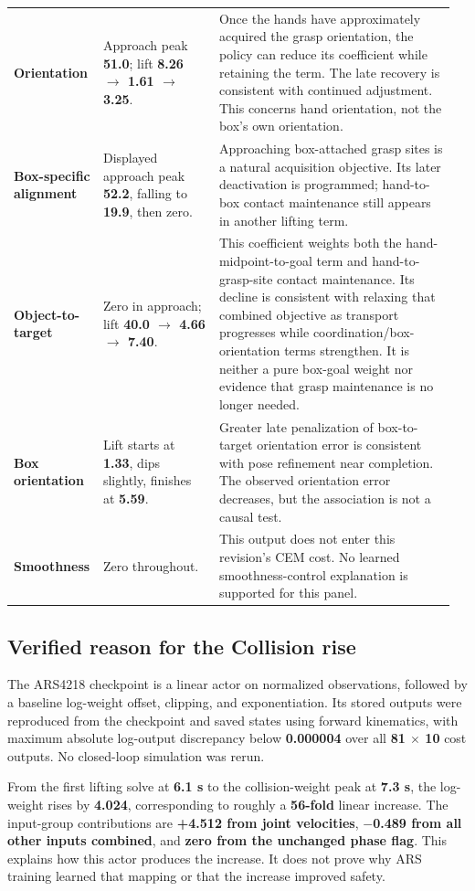 \documentclass[11pt,a4paper]{article}
\begin{document}
\begin{longtable}{@{}p{0.17\linewidth}p{0.26\linewidth}p{0.53\linewidth}@{}}
\textbf{Orientation} & Approach peak \textbf{51.0}; lift \textbf{8.26 \(\rightarrow\) 1.61 \(\rightarrow\) 3.25}. & Once the hands have approximately acquired the grasp orientation, the policy can reduce its coefficient while retaining the term. The late recovery is consistent with continued adjustment. This concerns hand orientation, not the box's own orientation. \\
\textbf{Box-specific alignment} & Displayed approach peak \textbf{52.2}, falling to \textbf{19.9}, then zero. & Approaching box-attached grasp sites is a natural acquisition objective. Its later deactivation is programmed; hand-to-box contact maintenance still appears in another lifting term. \\
\textbf{Object-to-target} & Zero in approach; lift \textbf{40.0 \(\rightarrow\) 4.66 \(\rightarrow\) 7.40}. & This coefficient weights both the hand-midpoint-to-goal term and hand-to-grasp-site contact maintenance. Its decline is consistent with relaxing that combined objective as transport progresses while coordination/box-orientation terms strengthen. It is neither a pure box-goal weight nor evidence that grasp maintenance is no longer needed. \\
\textbf{Box orientation} & Lift starts at \textbf{1.33}, dips slightly, finishes at \textbf{5.59}. & Greater late penalization of box-to-target orientation error is consistent with pose refinement near completion. The observed orientation error decreases, but the association is not a causal test. \\
\textbf{Smoothness} & Zero throughout. & This output does not enter this revision's CEM cost. No learned smoothness-control explanation is supported for this panel. \\
\end{longtable}
\endgroup

\subsection{Verified reason for the Collision rise}

The ARS4218 checkpoint is a linear actor on normalized observations, followed by a baseline log-weight offset, clipping, and exponentiation. Its stored outputs were reproduced from the checkpoint and saved states using forward kinematics, with maximum absolute log-output discrepancy below \textbf{0.000004} over all \textbf{81 \(\times\) 10} cost outputs. No closed-loop simulation was rerun.

From the first lifting solve at \textbf{6.1 s} to the collision-weight peak at \textbf{7.3 s}, the log-weight rises by \textbf{4.024}, corresponding to roughly a \textbf{56-fold} linear increase. The input-group contributions are \textbf{+4.512 from joint velocities}, \textbf{\(-\)0.489 from all other inputs combined}, and \textbf{zero from the unchanged phase flag}. This explains how this actor produces the increase. It does not prove why ARS training learned that mapping or that the increase improved safety.
\end{document}
